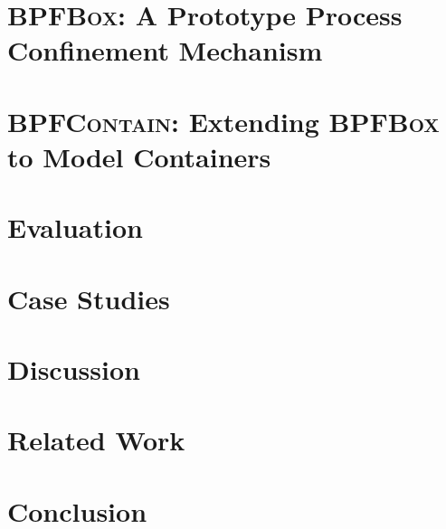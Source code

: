 \documentclass[
  fontsize=12pt,
  titlepage=firstiscover,
  paper=letter,
  twoside,
  cleardoublepage=plain,
  parskip=half-,
  DIV=10,
  parindent,
  appendixprefix,
  chapterprefix,
]{scrbook}
\newcommand{\bpfbox}{\textsc{BPFBox}}
\newcommand{\bpfcontain}{\textsc{BPFContain}}
\begin{document}
\chapter{\bpfbox: A Prototype Process Confinement Mechanism}%
\label{c:bpfbox}


\chapter{\bpfcontain: Extending \bpfbox{} to Model Containers}%
\label{c:bpfcontain}


\chapter{Evaluation}%
\label{c:evaluation}

\chapter{Case Studies}%
\label{c:case-studies}

\chapter{Discussion}%
\label{c:discussion}


\chapter{Related Work}%
\label{c:related}


\chapter{Conclusion}%
\label{c:conclusion}


\cleardoublepage%
\printbibliography%
%
\nocite{*} %

\appendix
\printglossary[type=\acronymtype, title=Glossary of Acronyms, toctitle=Glossary of Acronyms]
\end{document}
